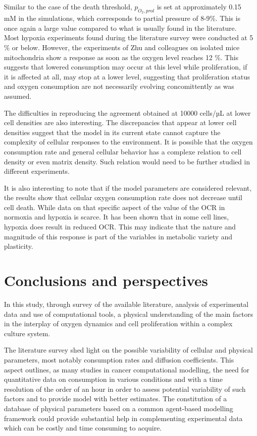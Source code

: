 \documentclass[11pt,a4paper]{article}
\begin{document}
Similar to the case of the death threshold, $p_{O_2,prol}$ is set at approximately 0.15 mM in the simulations, which corresponds to  partial pressure of 8-9\%. This is once again a large value compared to what is usually found in the literature. Most hypoxia experiments found during the literature survey were conducted at 5 \% or below.\cite{Chen2015}\cite{Cunha2019}\cite{Liu2022}\cite{Nisar2023} However, the experiments of Zhu and colleagues on isolated mice mitochondria show a response as soon as the oxygen level reaches 12 \%.\cite{Zhu2020} This suggests that lowered consumption may occur at this level while proliferation, if it is affected at all, may stop at a lower level, suggesting that proliferation status and oxygen consumption are not necessarily evolving concomittently as was assumed.

The difficulties in reproducing the agreement obtained at 10000 cells/µL at lower cell densities are also interesting. The discrepancies that appear at lower cell densities suggest that the model in its current state cannot capture the complexity of cellular responses to the environment. It is possible that the oxygen consumption rate and general cellular behavior has a complexe relation to cell density or even matrix density. Such relation would need to be further studied in different experiments. 

It is also interesting to note that if the model parameters are considered relevant, the results show that cellular oxygen consumption rate does not decrease until cell death.  While data on that specific aspect of the value of the OCR in normoxia and hypoxia is scarce. It has been shown that in some cell lines, hypoxia does result in reduced OCR.\cite{Papandreou2006} This may indicate that the nature and magnitude of this response is part of the variables in metabolic variety and plasticity.

\section{Conclusions and perspectives}
In this study, through survey of the available literature, analysis of experimental data and use of computational tools, a physical understanding of the main factors in the interplay of oxygen dynamics and cell proliferation within a complex culture system.

The literature survey shed light on the possible variability of cellular and physical parameters, most notably consumption rates and diffusion coefficients. This aspect outlines, as many studies in cancer computational modelling, the need for quantitative data on consumption in various conditions and with a time resolution of the order of an hour in order to assess potential variability of such factors and to provide model with better estimates. The constitution of a database of physical parameters based on a common agent-based modelling framework could provide substantial help in complementing experimental data which can be costly and time consuming to acquire.
\end{document}
